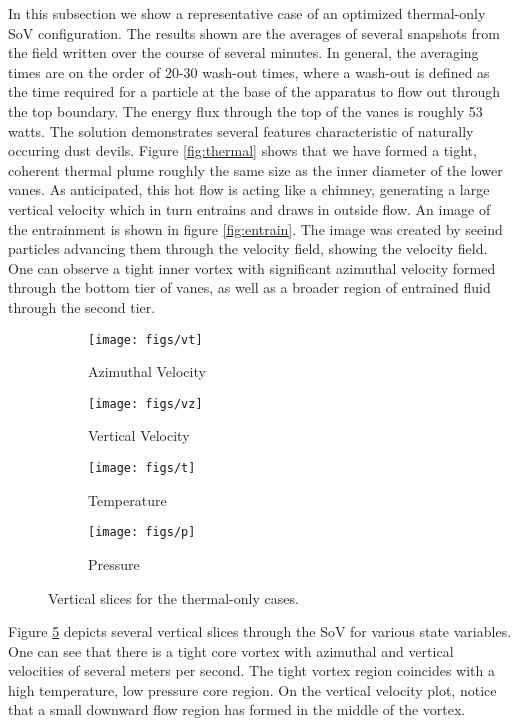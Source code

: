 In this subsection we show a representative case of an optimized thermal-only SoV
configuration. The results shown are the averages of several snapshots
from the field written over the course of several minutes. In general,
the averaging times are on the order of 20-30 wash-out times, where a
wash-out is defined as the time required for a particle at the base of
the apparatus to flow out through the top boundary. The energy flux
through the top of the vanes is roughly 53 watts. The solution
demonstrates several features characteristic of naturally occuring dust
devils. Figure \ref{fig:thermal} shows that we have formed a tight,
coherent thermal plume roughly the same size as the inner diameter of the
lower vanes. As anticipated, this hot flow is acting like a chimney,
generating a large vertical velocity which in turn entrains and draws in
outside flow. An image of the entrainment is shown in figure
\ref{fig:entrain}. The image was created by seeind particles advancing
them through the velocity field, showing the velocity field. One can
observe a tight inner vortex with significant azimuthal velocity formed
through the bottom tier of vanes, as well as a broader region of
entrained fluid through the second tier. 

\begin{figure}[htb]

 \begin{subfigure}{.5\textwidth}
  \centering
  \texttt{[image: figs/vt]}
  \caption{Azimuthal Velocity}
  \label{fig:vt-to}
 \end{subfigure}%
 \begin{subfigure}{.5\textwidth}
  \centering
  \texttt{[image: figs/vz]}
  \caption{Vertical Velocity}
  \label{fig:vz-to}
 \end{subfigure}%


 \begin{subfigure}{.5\textwidth}
  \centering
  \texttt{[image: figs/t]}
  \caption{Temperature}
  \label{fig:t-to}
 \end{subfigure}%
 \begin{subfigure}{.5\textwidth}
  \centering
  \texttt{[image: figs/p]}
  \caption{Pressure}
  \label{fig:p-to}
 \end{subfigure}%

 \caption{Vertical slices for the thermal-only cases.}
 \label{fig:to-vert}
\end{figure}

%
%
%
Figure \ref{fig:to-vert} depicts several vertical slices through the SoV
for various state variables. One can see that there is a tight core
vortex with azimuthal and vertical velocities of several meters per
second. The tight vortex region coincides with a high temperature, low
pressure core region. On the vertical velocity plot, notice that a small
downward flow region has formed in the middle of the vortex. 

